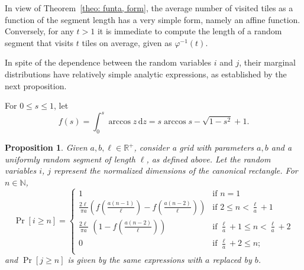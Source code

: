 \documentclass[12pt, a4paper]{article}
\newcommand{\diff}{\,\mathrm d}
\newcommand{\funta}{\varphi} %
\newcommand{\len}{\ell} %
\newcommand{\tiles}{t} %
\newcommand{\genvar}{s}
\newtheorem{proposition}{Proposition}%
\begin{document}
In view of Theorem~\ref{theo: funta, form}, the average number of visited tiles as a function of the segment length has a very simple form, namely an affine function. Conversely, for any $\tiles>1$ it is immediate to compute the length of a random segment that visits $\tiles$ tiles on average, given as $\funta^{-1}(\tiles)$.

In spite of the dependence between the random variables $i$ and $j$, their marginal distributions have relatively simple analytic expressions, as established by the next proposition.

For $0 \leq \genvar \leq 1$, let
\begin{equation}
\label{eq: f}
f(\genvar) = \int_0^\genvar \arccos z \diff z = \genvar \arccos \genvar - \sqrt{1-\genvar^2} + 1.
\end{equation}

\begin{proposition}
\label{prop: Pr i}
Given $a, b, \len \in \mathbb R^+$, consider a grid with parameters $a, b$ and a uniformly random segment of length $\len$, as defined above. Let the random variables $i$, $j$ represent the normalized dimensions of the canonical rectangle. For $n \in \mathbb N$,
\begin{equation}
\label{eq: Pr i geq n}
\Pr[i \geq n] = \begin{cases}
\displaystyle
1 &\text{if\ \ } \displaystyle n =1 \\[1 mm]
\displaystyle
\frac{2\len}{\pi a} \left(f\left(\frac{a(n-1)}{\len}\right)-f\left(\frac{a(n-2)}{\len} \right)\right) &\text{if\ \ } \displaystyle 2 \leq n < \frac \len a + 1 \\[4 mm]
\displaystyle
\frac{2\len}{\pi a}\,\, \left(1 - f\left(\frac{a(n-2)}{\len}\right)\right) &\text{if\ \ } \displaystyle \frac\len a + 1 \leq n < \frac\len a+2 \\[3 mm]
\displaystyle
0 &\text{if\ \ } \displaystyle \frac \len a + 2 \leq  n; \\
\end{cases}
\end{equation}
and $\Pr[j \geq n]$ is given by the same expressions with $a$ replaced by $b$.
\end{proposition}
\end{document}
